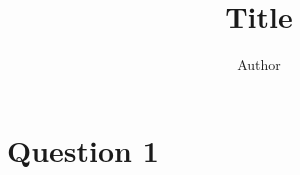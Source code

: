 \documentclass{article}
\title{Title}
\author{Author}
\date{}
\begin{document}
\maketitle
\thispagestyle{fancy}

\section{Question 1}
\end{document}
